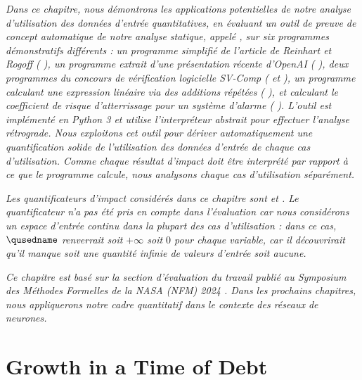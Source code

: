 \emph{Dans ce chapitre, nous démontrons les applications potentielles de notre analyse d'utilisation des données d'entrée quantitatives, en évaluant un outil de preuve de concept automatique de notre analyse statique, appelé \impatto\sidenotemark[\ref{impatto}], sur six programmes démonstratifs différents :
un programme simplifié de l'article de Reinhart et Rogoff (\cf{} ),
un programme extrait d'une présentation récente d'OpenAI (\cf{} ),
deux programmes du concours de vérification logicielle SV-Comp (\cf{}  et ),
un programme calculant une expression linéaire via des additions répétées (\cf{} ),
et  calculant le coefficient de risque d'atterrissage pour un système d'alarme (\cf{} ).
L'outil \impatto{} est implémenté en Python 3 et utilise l'interpréteur abstrait \interproc\sidenotemark[\ref{interproc}] pour effectuer l'analyse rétrograde.
Nous exploitons cet outil pour dériver automatiquement une quantification solide de l'utilisation des données d'entrée de chaque cas d'utilisation.
Comme chaque résultat d'impact doit être interprété par rapport à ce que le programme calcule, nous analysons chaque cas d'utilisation séparément.
}

\emph{
Les quantificateurs d'impact considérés dans ce chapitre sont \outcomesname{} et \rangename{}.
Le quantificateur \qusedname{} n'a pas été pris en compte dans l'évaluation car nous considérons un espace d'entrée continu dans la plupart des cas d'utilisation : dans ce cas, $\qusedname$ renverrait soit $+\infty$ soit $0$ pour chaque variable, car il découvrirait qu'il manque soit une quantité infinie de valeurs d'entrée soit aucune.
}

\emph{
Ce chapitre est basé sur la section d'évaluation du travail publié au Symposium des Méthodes Formelles de la NASA (NFM) 2024 . Dans les prochains chapitres, nous appliquerons notre cadre quantitatif dans le contexte des réseaux de neurones.}


\section{Growth in a Time of Debt}


